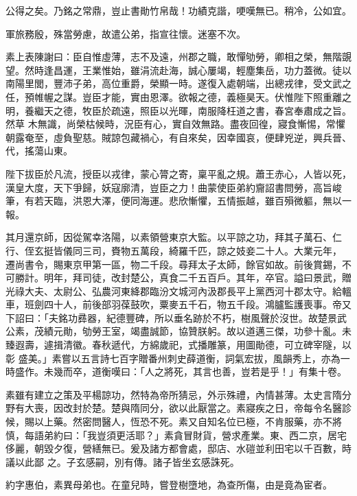 \begin{pinyinscope}
 公得之矣。乃銘之常鼎，豈止書勛竹帛哉！功績克諧，哽嘆無已。稍冷，公如宜。



 軍旅務殷，殊當勞慮，故遣公弟，指宣往懷。迷塞不次。



 素上表陳謝曰：臣自惟虛薄，志不及遠，州郡之職，敢憚劬勞，卿相之榮，無階覬望。然時逢昌運，王業惟始，雖涓流赴海，誠心屢竭，輕塵集岳，功力蓋微。徒以南陽里閭，豐沛子弟，高位重爵，榮顯一時。遂復入處朝端，出總戎律，受文武之任，預帷幄之謀。豈臣才能，實由恩澤。欲報之德，義極昊天。伏惟陛下照重離之明，養繼天之德，牧臣於疏遠，照臣以光暉，南服降枉道之書，春宮奉肅成之旨。然草
 木無識，尚榮枯候時，況臣有心，實自效無路。盡夜回徨，寢食慚惕，常懼朝露奄至，虛負聖慈。賊諒包藏禍心，有自來矣，因幸國哀，便肆兇逆，興兵晉、代，搖蕩山東。



 陛下拔臣於凡流，授臣以戎律，蒙心膂之寄，稟平亂之規。蕭王赤心，人皆以死，漢皇大度，天下爭歸，妖寇廓清，豈臣之力！曲蒙使臣弟約齎詔書問勞，高旨峻筆，有若天臨，洪恩大澤，便同海運。悲欣慚懼，五情振越，雖百殞微軀，無以一報。



 其月還京師，因從駕幸洛陽，以素領營東京大監。以平諒之功，拜其子萬石、仁行、侄玄挺皆儀同三司，賚物五萬段，綺羅千匹，諒之妓妾二十人。大業元年，
 遷尚書令，賜東京甲第一區，物二千段。尋拜太子太師，餘官如故。前後賞錫，不可勝計。明年，拜司徒，改封楚公，真食二千五百戶。其年，卒官。謚曰景武，贈光祿大夫、太尉公、弘農河東絳郡臨汾文城河內汲郡長平上黨西河十郡太守。給轀車，班劍四十人，前後部羽葆鼓吹，粟麥五千石，物五千段。鴻臚監護喪事。帝又下詔曰：「夫銘功彞器，紀德豐碑，所以垂名跡於不朽，樹風聲於沒世。故楚景武公素，茂績元勛，劬勞王室，竭盡誠節，協贊朕躬。故以道邁三傑，功參十亂。未臻遐壽，遽揖清徽。春秋遞代，方綿歲祀，式播雕篆，用圖勛德，可立碑宰隧，以彰
 盛美。」素嘗以五言詩七百字贈番州刺史薛道衡，詞氣宏拔，風韻秀上，亦為一時盛作。未幾而卒，道衡嘆曰：「人之將死，其言也善，豈若是乎！」有集十卷。



 素雖有建立之策及平楊諒功，然特為帝所猜忌，外示殊禮，內情甚薄。太史言隋分野有大喪，因改封於楚。楚與隋同分，欲以此厭當之。素寢疾之日，帝每令名醫診候，賜以上藥。然密問醫人，恆恐不死。素又自知名位已極，不肯服藥，亦不將慎，每語弟約曰：「我豈須更活耶？」素貪冒財貨，營求產業。東、西二京，居宅侈麗，朝毀夕復，營繕無已。爰及諸方都會處，邸店、水磑並利田宅以千百數，時議以此鄙
 之。子玄感嗣，別有傳。諸子皆坐玄感誅死。



 約字惠伯，素異母弟也。在童兒時，嘗登樹墮地，為查所傷，由是竟為宦者。




\end{pinyinscope}
